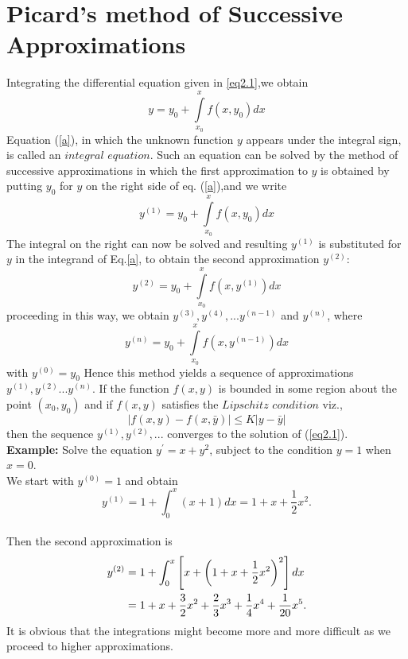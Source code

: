 \documentclass[12pt,a4paper,oneside]{book}
\begin{document}
\section{Picard's method of Successive Approximations}
Integrating the differential equation given in \ref{eq2.1},we obtain
\begin{equation}\label{a}y=y_0 + \int \limits_{x_0}^x f(x,y_0) dx \end{equation}
Equation (\ref{a}), in which the unknown function $y$ appears under the integral sign, is called an $integral$ $equation$. Such an equation can be solved by the method of successive approximations  in which the first approximation to $y$ is obtained by putting $y_0$ for $y$ on the right side  of eq. (\ref{a}),and we write 
\begin{equation*} y^{(1)}=y_0 + \int\limits_{x_0}^x f(x,y_0) dx \end{equation*}
The integral on the right can now be solved and resulting $y^{(1)}$ is substituted for $y$ in the integrand of Eq.\ref{a}, to obtain the second approximation $y^{(2)}$:
\begin{equation*} y^{(2)}=y_0 + \int\limits_{x_0}^x f(x,y^{(1)}) dx \end{equation*}
proceeding in this way, we obtain $y^{(3)},y^{(4)},...y^{(n-1)}$ and $y^{(n)}$, where
\begin{equation} y^{(n)}=y_0 + \int\limits_{x_0}^x f(x,y^{(n-1)}) dx \end{equation}
with $y^{(0)}=y_0$
Hence this method yields a sequence of approximations $y^{(1)},y^{(2)}...y^{(n)}$. If the function $f(x,y)$ is bounded in some region about the point $(x_0,y_0)$ and if $f(x,y)$ satisfies the $Lipschitz$ $condition$ viz.,
\begin{equation}
	|f(x,y)-f(x,\bar{y})|\leq K|y-\bar{y}|
\end{equation}
then the sequence $y^{(1)},y^{(2)},...$ converges to the solution of (\ref{eq2.1}).\\
\textbf{Example:}\vspace{.3cm}
Solve the equation $y^{\prime}=x+y^2$, subject to the condition $y=1$ when $x=0$.\\ We start with $y^{(0)}=1$ and obtain \\$$ y^{(1)}=1+\int_0^x(x+1) d x=1+x+\frac{1}{2} x^2 . $$ \\Then the second approximation is $$ \begin{aligned} y^{(2)} & =1+\int_0^x\left[x+\left(1+x+\frac{1}{2} x^2\right)^2\right] d x \\ \vspace{.3cm}& =1+x+\frac{3}{2} x^2+\frac{2}{3} x^3+\frac{1}{4} x^4+\frac{1}{20} x^5 . \end{aligned} $$ It is obvious that the integrations might become more and more difficult as we proceed to higher approximations.\\
\end{document}
